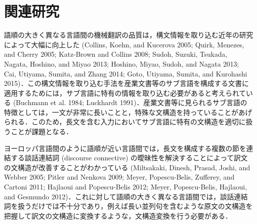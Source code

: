 \documentclass[japanese]{jnlp_1.4}
\begin{document}
\section{関連研究}

語順の大きく異なる言語間の機械翻訳の品質は，構文情報を取り込む近年の研究によって大幅に向上した (Collins, 
Koehn, and Kucerova 2005; Quirk, Menezes, and Cherry 2005; Katz-Brown and 
Collins 2008; Sudoh, Suzuki, Tsukada, Nagata, Hoshino, and Miyao 2013; 
Hoshino, Miyao, Sudoh, and Nagata 2013; Cai, Utiyama, Sumita, and Zhang 
2014; Goto, Utiyama, Sumita, and Kurohashi 
2015)．この構文情報を取り込む手法を産業文書等のサブ言語を構成する文書に適用するためには，サブ言語に特有の情報を取り込む必要があると考えられている (Buchmann 
et al. 1984; Luckhardt 
1991)．産業文書等に見られるサブ言語の特徴としては，一文が非常に長いことと，特殊な文構造を持っていることがあげられる．このため，長文を含む入力においてサブ言語に特有の文構造を適切に扱うことが課題となる．

ヨーロッパ言語間のように語順が近い言語間では，長文を構成する複数の節を連結する談話連結詞 (discourse 
connective) の曖昧性を解決することによって訳文の文構造が改善することがわかっている (Miltsakaki, 
Dinesh, Prasad, Joshi, and Webber 2005; Pitler and Nenkova 2009; Meyer, 
Popescu-Belis, Zufferey, and Cartoni 2011; Hajlaoui and Popescu-Belis 2012; 
Meyer, Popescu-Belis, Hajlaoui, and Gesmundo 
2012)．これに対して語順の大きく異なる言語間では，談話連結詞を扱うだけでは不十分であり，例えば長い並列句を含むような原文の文構造を把握して訳文の文構造に変換するような，文構造変換を行う必要がある．
\end{document}
